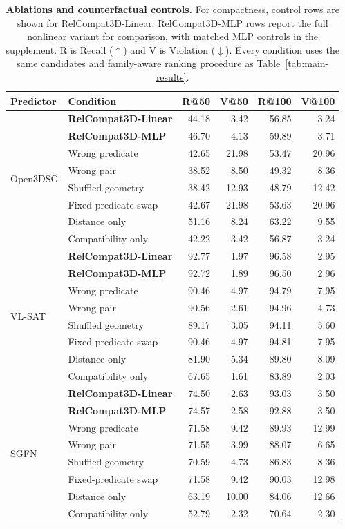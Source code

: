 \begin{table}[t]
\centering
{\small
\setlength{\tabcolsep}{1.5pt}
\begin{tabular}{@{}llrrrr@{}}
\toprule
Predictor & Condition & R@50 & V@50 & R@100 & V@100 \\
\midrule
\multirow{8}{*}{Open3DSG} & \textbf{RelCompat3D-Linear} & 44.18 & 3.42 & 56.85 & 3.24 \\
& \textbf{RelCompat3D-MLP} & 46.70 & 4.13 & 59.89 & 3.71 \\
& Wrong predicate & 42.65 & 21.98 & 53.47 & 20.96 \\
& Wrong pair & 38.52 & 8.50 & 49.32 & 8.36 \\
& Shuffled geometry & 38.42 & 12.93 & 48.79 & 12.42 \\
& Fixed-predicate swap & 42.67 & 21.98 & 53.63 & 20.96 \\
& Distance only & 51.16 & 8.24 & 63.22 & 9.55 \\
& Compatibility only & 42.22 & 3.42 & 56.87 & 3.24 \\
\midrule
\multirow{8}{*}{VL-SAT} & \textbf{RelCompat3D-Linear} & 92.77 & 1.97 & 96.58 & 2.95 \\
& \textbf{RelCompat3D-MLP} & 92.72 & 1.89 & 96.50 & 2.96 \\
& Wrong predicate & 90.46 & 4.97 & 94.79 & 7.95 \\
& Wrong pair & 90.56 & 2.61 & 94.96 & 4.73 \\
& Shuffled geometry & 89.17 & 3.05 & 94.11 & 5.60 \\
& Fixed-predicate swap & 90.46 & 4.97 & 94.81 & 7.95 \\
& Distance only & 81.90 & 5.34 & 89.80 & 8.09 \\
& Compatibility only & 67.65 & 1.61 & 83.89 & 2.03 \\
\midrule
\multirow{8}{*}{SGFN} & \textbf{RelCompat3D-Linear} & 74.50 & 2.63 & 93.03 & 3.50 \\
& \textbf{RelCompat3D-MLP} & 74.57 & 2.58 & 92.88 & 3.50 \\
& Wrong predicate & 71.58 & 9.42 & 89.93 & 12.99 \\
& Wrong pair & 71.55 & 3.99 & 88.07 & 6.65 \\
& Shuffled geometry & 70.59 & 4.73 & 86.83 & 8.36 \\
& Fixed-predicate swap & 71.58 & 9.42 & 90.03 & 12.98 \\
& Distance only & 63.19 & 10.00 & 84.06 & 12.66 \\
& Compatibility only & 52.79 & 2.32 & 70.64 & 2.30 \\
\bottomrule
\end{tabular}
}
\caption{\textbf{Ablations and counterfactual controls.} For compactness, control rows are shown for RelCompat3D-Linear. RelCompat3D-MLP rows report the full nonlinear variant for comparison, with matched MLP controls in the supplement. R is Recall ($\uparrow$) and V is Violation ($\downarrow$). Every condition uses the same candidates and family-aware ranking procedure as Table~\ref{tab:main-results}.}
\label{tab:ablations}
\end{table}

